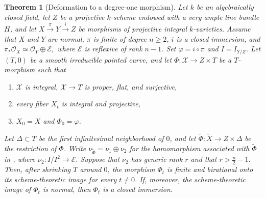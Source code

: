 \documentclass[11pt,twoside]{amsart}
\theoremstyle{plain}
\numberwithin{equation}{section}
\newtheorem{theorem}{Theorem}[section]
\theoremstyle{definition}
\begin{document}
\begin{theorem}[Deformation to a degree-one morphism]
\label{thm:deformation-degree-one}
Let $k$ be an algebraically closed field, let $Z$ be a projective $k$-scheme endowed with a very ample line bundle $H$, and let
$
X\xrightarrow{\pi}Y\xrightarrow{i}Z
$
be morphisms of projective integral $k$-varieties. Assume that $X$ and $Y$ are normal, $\pi$ is finite of degree $n\geq 2$, $i$ is a closed immersion, and
$
\pi_*\mathcal O_X\simeq\mathcal O_Y\oplus\mathcal E,
$
where $\mathcal E$ is reflexive of rank $n-1$. Set $\varphi=i\circ\pi$ and $I=I_{Y/Z}$. Let $(T,0)$ be a smooth irreducible pointed curve, and let
$
\Phi:\mathscr X\to Z\times T
$
be a $T$-morphism such that
\begin{enumerate}
    \item $\mathscr X$ is integral, $\mathscr X\to T$ is proper, flat, and surjective, 
    \item every fiber $X_t$ is integral and projective,
    \item $X_0=X$ and $\Phi_0=\varphi$.
\end{enumerate}
Let $\Delta\subset T$ be the first infinitesimal neighborhood of $0$, and let
$
\widetilde\Phi:\widetilde X\to Z\times\Delta
$
be the restriction of $\Phi$. Write
$
\nu_{\widetilde\Phi}=\nu_1\oplus\nu_2
$
for the homomorphism associated with $\widetilde\Phi$ in , where
$
\nu_2:I/I^2\to\mathcal E.
$
Suppose that $\nu_2$ has generic rank $r$ and that
$
r>\frac{n}{2}-1.
$
Then, after shrinking $T$ around $0$, the morphism $\Phi_t$ is finite and birational onto its scheme-theoretic image for every $t\neq 0$. If, moreover, the scheme-theoretic image of $\Phi_t$ is normal, then $\Phi_t$ is a closed immersion.
\end{theorem}
\end{document}
